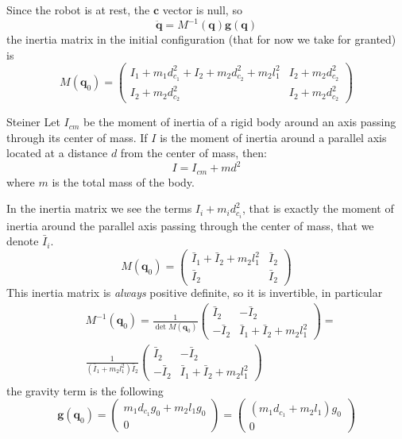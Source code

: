 \documentclass[10pt, a4paper]{report}
\begin{document}
Since the robot is at rest, the $\mathbf c$ vector is null, so\begin{equation}
    \ddot{\mathbf q}=M^{-1}(\mathbf q)\mathbf g(\mathbf q)
\end{equation}
the inertia matrix in the initial configuration (that for now we take for granted) is\begin{equation}
    M(\mathbf q_0)=\begin{pmatrix}
        I_1+m_1d_{c_1}^2+I_2+m_2d_{c_2}^2+m_2l_1^2 &I_2+m_2d_{c_2}^2\\ 
        I_2+m_2d_{c_2}^2&I_2+m_2d_{c_2}^2
    \end{pmatrix}
\end{equation}
\begin{boxtheorem}{Steiner}{}
    Let $I_{cm}$ be the moment of inertia of a rigid body around an axis passing through its center of mass. 
If $I$ is the moment of inertia around a parallel axis located at a distance $d$ from the center of mass, 
then:
$$I = I_{cm} + md^2$$
where $m$ is the total mass of the body.
\end{boxtheorem}
In the inertia matrix we see the terms $I_i+m_id_{c_i}^2$, that is exactly the moment of inertia around the parallel axis passing through the center of mass, that we denote $\bar I_i$.
\begin{equation}
    M(\mathbf q_0)=\begin{pmatrix}
        \bar I_1+\bar I_2+m_2l_1^2 &\bar I_2\\ 
       \bar I_2&\bar I_2
    \end{pmatrix}
\end{equation}
This inertia matrix is \textit{always} positive definite, so it is invertible, in particular\begin{align}
    &M^{-1}(\mathbf q_0)=\frac{1}{\det M(\mathbf q_0)}\begin{pmatrix}
        \bar I_2&-\bar I_2\\ 
       -\bar I_2&\bar I_1+\bar I_2+m_2l_1^2 
    \end{pmatrix}=\\ &\frac{1}{(\bar I_1+m_2l_1^2)\bar I_2}\begin{pmatrix}
        \bar I_2&-\bar I_2\\ 
       -\bar I_2&\bar I_1+\bar I_2+m_2l_1^2 
    \end{pmatrix}
\end{align}
the gravity term is the following\begin{equation}
    \mathbf g(\mathbf q_0)=\begin{pmatrix}
        m_1d_{c_1}g_0+m_2l_1g_0\\ 0
    \end{pmatrix}=\begin{pmatrix}
        (m_1d_{c_1}+m_2l_1)g_0\\ 0
    \end{pmatrix}
\end{equation}
\end{document}
